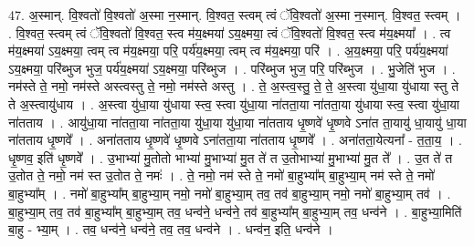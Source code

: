 \documentclass[17pt]{extarticle}
\begin{document}
47. अ॒स्मान्. वि॒श्वतो॑ वि॒श्वतो॑ अ॒स्मा न॒स्मान्. वि॒श्वत॒ स्त्वम् त्वं ॅवि॒श्वतो॑ अ॒स्मा न॒स्मान्. वि॒श्वत॒ स्त्वम् । . वि॒श्वत॒ स्त्वम् त्वं ॅवि॒श्वतो॑ वि॒श्वत॒ स्त्व म॑य॒क्ष्मया॑ ऽय॒क्ष्मया॒ त्वं ॅवि॒श्वतो॑ वि॒श्वत॒ स्त्व म॑य॒क्ष्मया᳚ । . त्व म॑य॒क्ष्मया॑ ऽय॒क्ष्मया॒ त्वम् त्व म॑य॒क्ष्मया॒ परि॒ पर्य॑य॒क्ष्मया॒ त्वम् त्व म॑य॒क्ष्मया॒ परि॑ । . अ॒य॒क्ष्मया॒ परि॒ पर्य॑य॒क्ष्मया॑ ऽय॒क्ष्मया॒ परि॑ब्भुज भुज॒ पर्य॑य॒क्ष्मया॑ ऽय॒क्ष्मया॒ परि॑ब्भुज । . परि॑ब्भुज भुज॒ परि॒ परि॑ब्भुज । . भु॒जेति॑ भुज । . नम॑स्ते ते॒ नमो॒ नम॑स्ते अस्त्वस्तु ते॒ नमो॒ नम॑स्ते अस्तु । . ते॒ अ॒स्त्व॒स्तु॒ ते॒ ते॒ अ॒स्त्वा यु॑धा॒या यु॑धाया स्तु ते ते अ॒स्त्वायु॑धाय । . अ॒स्त्वा यु॑धा॒या यु॑धाया स्त्व॒ स्त्वा यु॑धा॒या ना॑तता॒या ना॑तता॒या यु॑धाया स्त्व॒ स्त्वा यु॑धा॒या ना॑तताय । . आयु॑धा॒या ना॑तता॒या ना॑तता॒या यु॑धा॒या यु॑धा॒या ना॑तताय धृ॒ष्णवे॑ धृ॒ष्णवे 
ऽना॑त ता॒यायु॑ धा॒यायु॑ धा॒या ना॑तताय धृ॒ष्णवे᳚ । . अना॑तताय धृ॒ष्णवे॑ धृ॒ष्णवे ऽना॑तता॒या ना॑तताय धृ॒ष्णवे᳚ । . अना॑तता॒येत्यना᳚ - त॒ता॒य॒ । . धृ॒ष्णव॒ इति॑ धृ॒ष्णवे᳚ । . उ॒भाभ्या॑ मु॒तोतो भाभ्या॑ मु॒भाभ्या॑ मु॒त ते॑ त उ॒तोभाभ्या॑ मु॒भाभ्या॑ मु॒त ते᳚ । . उ॒त ते॑ त उ॒तोत ते॒ नमो॒ नम॑ स्त उ॒तोत ते॒ नमः॑ । . ते॒ नमो॒ नम॑ स्ते ते॒ नमो॑ बा॒हुभ्या᳚म् बा॒हुभ्या॒म् नम॑ स्ते ते॒ नमो॑ बा॒हुभ्या᳚म् । . नमो॑ बा॒हुभ्या᳚म् बा॒हुभ्या॒म् नमो॒ नमो॑ बा॒हुभ्या॒म् तव॒ तव॑ बा॒हुभ्या॒म् नमो॒ नमो॑ बा॒हुभ्या॒म् तव॑ । . बा॒हुभ्या॒म् तव॒ तव॑ बा॒हुभ्या᳚म् बा॒हुभ्या॒म् तव॒ धन्व॑ने॒ धन्व॑ने॒ तव॑ बा॒हुभ्या᳚म् बा॒हुभ्या॒म् तव॒ धन्व॑ने । . बा॒हुभ्या॒मिति॑ बा॒हु - भ्या॒म् । . तव॒ धन्व॑ने॒ धन्व॑ने॒ तव॒ तव॒ धन्व॑ने । . धन्व॑न॒ इति॒ धन्व॑ने । \newline
\end{document}
